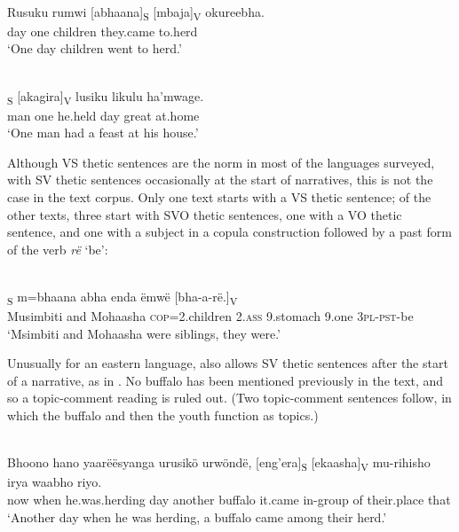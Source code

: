 \documentclass[output=paper]{langsci/langscibook}
\begin{document}
\ea\label{ex:27.nicolle}
\\
\gll Rusuku rumwi [abhaana]\textsubscript{S} [mbaja]\textsubscript{V} okureebha.\\
day one {\db}children {\db}they.came to.herd\\
\glt ‘One day children went to herd.’
\z

\ea\label{ex:28.nicolle}
\\
\textsubscript{S} [akagira]\textsubscript{V} lusiku likulu ha’mwage.\\
{\db}man one {\db}he.held day great at.home\\
\glt ‘One man had a feast at his house.’
\z

Although VS thetic sentences are the norm in most of the languages surveyed, with SV thetic sentences occasionally at the start of narratives, this is not the case in the  text corpus. Only one  text starts with a VS thetic sentence; of the other texts, three start with SVO thetic sentences, one with a VO thetic sentence, and one with a subject in a copula construction followed by a past form of the verb \textit{rë} ‘be’:


\ea\label{ex:29.nicolle}
\\
\textsubscript{S} m=bhaana abha enda ëmwë [bha-a-rë.]\textsubscript{V}\\
{\db}Musimbiti and Mohaasha \textsc{cop}=2.children 2.\textsc{ass} 9.stomach 9.one {\db}\textsc{3pl-pst}-be\\
\glt ‘Msimbiti and Mohaasha were siblings, they were.’
\z

Unusually for an eastern  language,  also allows SV thetic sentences after the start of a narrative, as in . No buffalo has been mentioned previously in the text, and so a topic-comment reading is ruled out. (Two topic-comment sentences follow, in which the buffalo and then the youth function as topics.)

\ea\label{ex:30.nicolle}
\\
\gll Bhoono hano yaarëësyanga urusikö urwöndë, [eng’era]\textsubscript{S} [ekaasha]\textsubscript{V} mu-rihisho irya waabho riyo.\\
now when he.was.herding day another {\db}buffalo {\db}it.came in-group of their.place that\\
\glt ‘Another day when he was herding, a buffalo came among their herd.’
\z
\end{document}
